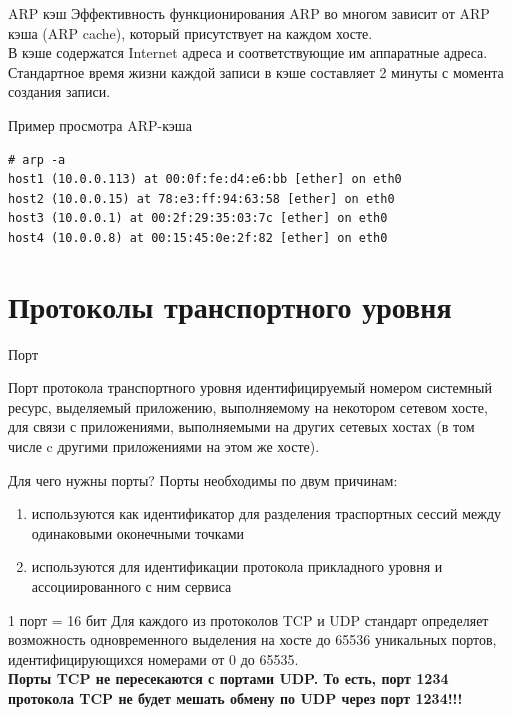 \begin{frame}{ARP кэш}
	Эффективность функционирования ARP во многом зависит от ARP кэша (ARP cache),  который присутствует на каждом хосте.\\
	В кэше содержатся Internet адреса и соответствующие им аппаратные адреса.\\
	Стандартное время жизни каждой записи в кэше составляет 2 минуты с момента создания записи.
\end{frame}

\begin{frame}[fragile]{Пример просмотра ARP-кэша}
\scriptsize
	\begin{verbatim}
# arp -a
host1 (10.0.0.113) at 00:0f:fe:d4:e6:bb [ether] on eth0
host2 (10.0.0.15) at 78:e3:ff:94:63:58 [ether] on eth0
host3 (10.0.0.1) at 00:2f:29:35:03:7c [ether] on eth0
host4 (10.0.0.8) at 00:15:45:0e:2f:82 [ether] on eth0
	\end{verbatim}
\normalsize
\end{frame}

\section{Протоколы транспортного уровня}

\begin{frame}{Порт}
	\begin{block}{Порт протокола транспортного уровня}
	идентифицируемый номером системный ресурс,  выделяемый приложению,  выполняемому на некотором сетевом хосте,  для связи с приложениями,  выполняемыми на других сетевых хостах (в том числе c другими приложениями на этом же хосте).
	\end{block}
\end{frame}
\begin{frame}{Для чего нужны порты?}
	Порты необходимы по двум причинам:
	\begin{enumerate}
		\item используются как идентификатор для разделения траспортных сессий между одинаковыми оконечными точками
		\item используются для идентификации протокола прикладного уровня и ассоциированного с ним сервиса
	\end{enumerate}
\end{frame}
\begin{frame}{1 порт = 16 бит}
Для каждого из протоколов TCP и UDP стандарт определяет возможность одновременного выделения на хосте до 65536 уникальных портов,  идентифицирующихся номерами от 0 до 65535.\\
	\pause
	{\bfseries Порты TCP не пересекаются с портами UDP. То есть,  порт 1234 протокола TCP не будет мешать обмену по UDP через порт 1234!!!}
\end{frame}

